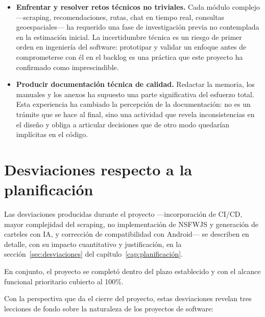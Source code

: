 \begin{itemize}
    \item \textbf{Enfrentar y resolver retos técnicos no triviales.} Cada módulo complejo ---scraping, recomendaciones, rutas, chat en tiempo real, consultas geoespaciales--- ha requerido una fase de investigación previa no contemplada en la estimación inicial. La incertidumbre técnica es un riesgo de primer orden en ingeniería del software: prototipar y validar un enfoque antes de comprometerse con él en el backlog es una práctica que este proyecto ha confirmado como imprescindible.

    \item \textbf{Producir documentación técnica de calidad.} Redactar la memoria, los manuales y los anexos ha supuesto una parte significativa del esfuerzo total. Esta experiencia ha cambiado la percepción de la documentación: no es un trámite que se hace al final, sino una actividad que revela inconsistencias en el diseño y obliga a articular decisiones que de otro modo quedarían implícitas en el código.
\end{itemize}

\section{Desviaciones respecto a la planificación}

Las desviaciones producidas durante el proyecto ---incorporación de CI/CD, mayor complejidad del scraping, no implementación de NSFWJS y generación de carteles con IA, y corrección de compatibilidad con Android--- se describen en detalle, con su impacto cuantitativo y justificación, en la sección~\ref{sec:desviaciones} del capítulo~\ref{cap:planificación}.

En conjunto, el proyecto se completó dentro del plazo establecido y con el alcance funcional prioritario cubierto al 100\%.

Con la perspectiva que da el cierre del proyecto, estas desviaciones revelan tres lecciones de fondo sobre la naturaleza de los proyectos de software:


